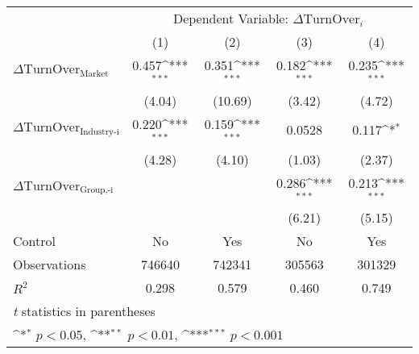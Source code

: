 {
\def\sym#1{\ifmmode^{#1}\else\(^{#1}\)\fi}
\begin{tabular}{l*{4}{c}}
\hline\hline
                    &\multicolumn{4}{c}{Dependent Variable: $\Delta \text{TurnOver}_{i} $ }                 \\\cmidrule(lr){2-5}
                    &\multicolumn{1}{c}{(1)}         &\multicolumn{1}{c}{(2)}         &\multicolumn{1}{c}{(3)}         &\multicolumn{1}{c}{(4)}         \\
\hline
 $ \Delta \text{TurnOver}_{\text{Market}} $ &       0.457\sym{***}&       0.351\sym{***}&       0.182\sym{***}&       0.235\sym{***}\\
                    &      (4.04)         &     (10.69)         &      (3.42)         &      (4.72)         \\
[1em]
 $ \Delta \text{TurnOver}_{\text{Industry-i}} $ &       0.220\sym{***}&       0.159\sym{***}&      0.0528         &       0.117\sym{*}  \\
                    &      (4.28)         &      (4.10)         &      (1.03)         &      (2.37)         \\
[1em]
 $ \Delta \text{TurnOver}_{\text{Group,-i}} $ &                     &                     &       0.286\sym{***}&       0.213\sym{***}\\
                    &                     &                     &      (6.21)         &      (5.15)         \\
\hline
Control             &          No         &         Yes         &          No         &         Yes         \\
Observations        &      746640         &      742341         &      305563         &      301329         \\
$ R^2 $             &       0.298         &       0.579         &       0.460         &       0.749         \\
\hline\hline
\multicolumn{5}{l}{\footnotesize \textit{t} statistics in parentheses}\\
\multicolumn{5}{l}{\footnotesize \sym{*} \(p<0.05\), \sym{**} \(p<0.01\), \sym{***} \(p<0.001\)}\\
\end{tabular}
}
